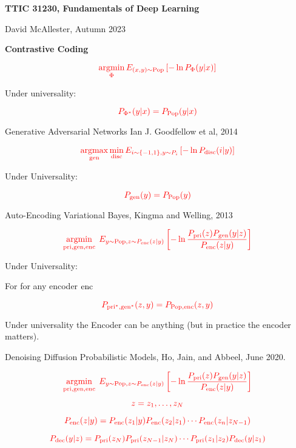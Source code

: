 





{\Huge
  \centerline{\bf TTIC 31230,  Fundamentals of Deep Learning}
  \vfill
  \centerline{David McAllester, Autumn   2023}
  \vfill
  \centerline{\bf Contrastive Coding}
  \vfill
  \vfill


$${\color{red} \operatorname*{argmin}_\Phi E_{(x,y)\sim \mathrm{Pop}}\left[-\ln P_\Phi(y|x)\right]}$$

\vfill
Under universality:

$${\color{red} P_{\Phi^*}(y|x) = P_{\mathrm{Pop}}(y|x)}$$


Generative Adversarial Networks
Ian J. Goodfellow et al, 2014

\vfill
$${\color{red} \operatorname*{argmax}_{\mathrm{gen}} \min_{\mathrm{disc}} E_{i \sim \{-1,1\}, y \sim P_i}\left[-\ln P_{\mathrm{disc}}(i|y)\right]}$$

\vfill
Under Universality:

\vfill
$${\color{red} P_{\mathrm{gen}}(y) = P_{\mathrm{Pop}}(y)}$$


Auto-Encoding Variational Bayes, Kingma and Welling, 2013

\vfill
$${\color{red} \operatorname*{argmin}_{\mathrm{pri},\mathrm{gen},\mathrm{enc}}\;E_{y \sim \mathrm{Pop},z \sim P_{\mathrm{enc}}(z|y)}\left[ - \ln \frac{P_{\mathrm{pri}}(z)P_{\mathrm{gen}}(y|z)}{P_{\mathrm{enc}}(z|y)}\right]}$$

\vfill
Under Universality:

\vfill
For for any encoder $\mathrm{enc}$

\vfill
$${\color{red} P_{\mathrm{pri}^*,\mathrm{gen}^*}(z,y) = P_{\mathrm{Pop},\mathrm{enc}}(z,y)}$$

\vfill
Under universality the Encoder can be anything (but in practice the encoder matters).


Denoising Diffusion Probabilistic Models, Ho, Jain, and Abbeel, June 2020.

{\huge
$${\color{red} \operatorname*{argmin}_{\mathrm{pri},\mathrm{gen},\mathrm{enc}}\;E_{y \sim \mathrm{Pop},z \sim P_{\mathrm{enc}}(z|y)}\left[ - \ln \frac{P_{\mathrm{pri}}(z)P_{\mathrm{gen}}(y|z)}{P_{\mathrm{enc}}(z|y)}\right]}$$

$${\color{red} z = z_1,\ldots,z_N}$$

\vfill
$${\color{red} P_{\mathrm{enc}}(z|y) = P_{\mathrm{enc}}(z_1|y)P_{\mathrm{enc}}(z_2|z_1)\cdots P_{\mathrm{enc}}(z_n|z_{N-1})}$$

$${\color{red} P_{\mathrm{dec}}(y|z) = P_{\mathrm{pri}}(z_N)P_{\mathrm{pri}}(z_{N-1}|z_N)\cdots P_{\mathrm{pri}}(z_1|z_2)P_{\mathrm{dec}}(y|z_1)}$$

}}
